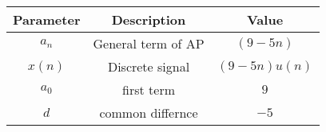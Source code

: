 \begin{tabular}{|c|c|c|}
\hline
     \textbf{Parameter} & \textbf{Description} & \textbf{Value} \\
     \hline
     $a_n$ & General term of AP & $(9 -5n)$\\
     \hline
     $x(n)$ & Discrete signal & $(9-5n)u(n)$\\
     \hline
     $a_0$ & first term & $9$\\
     \hline
     $d$ & common differnce & $-5$ \\
     \hline
\end{tabular}
